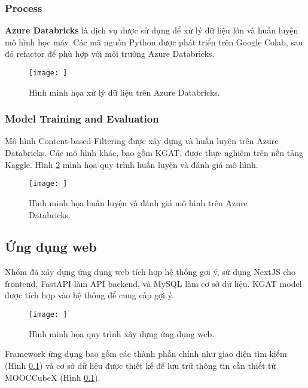 \subsubsection{Process}
\textbf{Azure Databricks} là dịch vụ được sử dụng để xử lý dữ liệu lớn và huấn luyện mô hình học máy. Các mã nguồn Python được phát triển trên Google Colab, sau đó refactor để phù hợp với môi trường Azure Databricks.

\begin{figure}[ht]
    \centering
    \texttt{[image: ]}
    \caption{Hình minh họa xử lý dữ liệu trên Azure Databricks.}
    \label{fig:hinh4_8}
\end{figure}

\subsubsection{Model Training and Evaluation}
Mô hình Content-based Filtering được xây dựng và huấn luyện trên Azure Databricks. Các mô hình khác, bao gồm KGAT, được thực nghiệm trên nền tảng Kaggle. Hình \ref{fig:hinh4_13} minh họa quy trình huấn luyện và đánh giá mô hình.

\begin{figure}[ht]
    \centering
    \texttt{[image: ]}
    \caption{Hình minh họa huấn luyện và đánh giá mô hình trên Azure Databricks.}
    \label{fig:hinh4_13}
\end{figure}

\subsection{Ứng dụng web}
Nhóm đã xây dựng ứng dụng web tích hợp hệ thống gợi ý, sử dụng NextJS cho frontend, FastAPI làm API backend, và MySQL làm cơ sở dữ liệu. KGAT model được tích hợp vào hệ thống để cung cấp gợi ý.

\begin{figure}[ht]
    \centering
    \texttt{[image: ]}
    \caption{Hình minh họa quy trình xây dựng ứng dụng web.}
    \label{fig:hinh4_15}
\end{figure}

Framework ứng dụng bao gồm các thành phần chính như giao diện tìm kiếm (Hình \ref{}) và cơ sở dữ liệu được thiết kế để lưu trữ thông tin cần thiết từ MOOCCubeX (Hình \ref{}).
